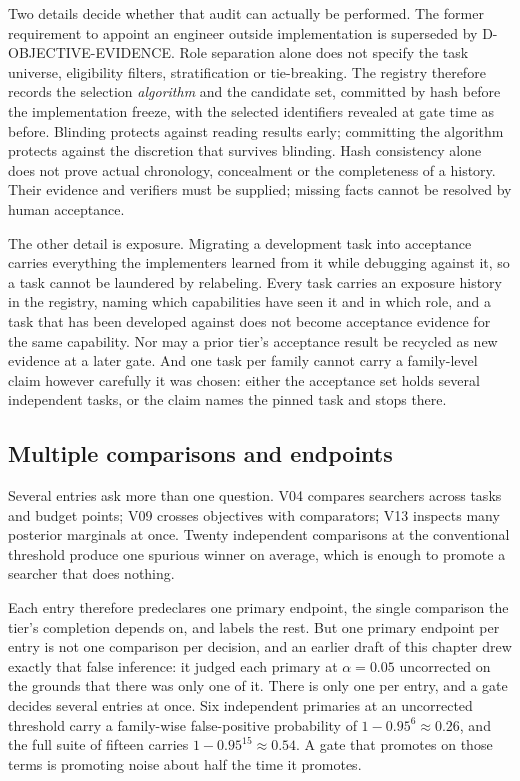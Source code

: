 Two details decide whether that audit can actually be performed.
The former requirement to appoint an engineer outside implementation is
superseded by D-OBJECTIVE-EVIDENCE. Role separation alone does not specify
the task universe, eligibility filters, stratification or tie-breaking.
The registry therefore records the selection
\emph{algorithm} and the candidate set, committed by hash before the
implementation freeze, with the selected identifiers revealed at gate
time as before. Blinding protects against reading results early;
committing the algorithm protects against the discretion that survives
blinding. Hash consistency alone does not prove actual chronology,
concealment or the completeness of a history. Their evidence and verifiers
must be supplied; missing facts cannot be resolved by human acceptance.

The other detail is exposure. Migrating a development task into
acceptance carries everything the implementers learned from it while
debugging against it, so a task cannot be laundered by relabeling.
Every task carries an exposure history in the registry, naming which
capabilities have seen it and in which role, and a task that has been
developed against does not become acceptance evidence for the same
capability. Nor may a prior tier's acceptance result be recycled as new
evidence at a later gate. And one task per family cannot carry a
family-level claim however carefully it was chosen: either the acceptance
set holds several independent tasks, or the claim names the pinned task
and stops there.

\subsection{Multiple comparisons and endpoints}

Several entries ask more than one question. V04 compares searchers
across tasks and budget points; V09 crosses objectives with
comparators; V13 inspects many posterior marginals at once. Twenty
independent comparisons at the conventional threshold produce one
spurious winner on average, which is enough to promote a searcher
that does nothing.

Each entry therefore predeclares one primary endpoint, the single
comparison the tier's completion depends on, and labels the rest. But
one primary endpoint per entry is not one comparison per decision, and
an earlier draft of this chapter drew exactly that false inference: it
judged each primary at $\alpha = 0.05$ uncorrected on the grounds that
there was only one of it. There is only one per entry, and a gate
decides several entries at once. Six independent primaries at an
uncorrected threshold carry a family-wise false-positive probability of
$1 - 0.95^6 \approx 0.26$, and the full suite of fifteen carries
$1 - 0.95^{15} \approx 0.54$. A gate that promotes on those terms is
promoting noise about half the time it promotes.

